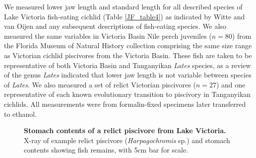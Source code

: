 We measured lower jaw length and standard length for all described species of Lake Victoria fish-eating cichlid (Table \ref{JF_table4}) as indicated by Witte and van Oijen \cite{witte1990taxonomy} and any subsequent descriptions of fish-eating species. \cite{van1991systematic, van1992haplochromis, van2004haplochromis, van2008haplochromis} We also measured the same variables in Victoria Basin Nile perch juveniles ($n=80$) from the Florida Museum of Natural History collection comprising the same size range as Victorian cichlid piscivores from the Victoria Basin. These fish are taken to be representative of both Victoria Basin and Tanganyikan {\em Lates} species, as a review \cite{greenwood1976review} of the genus {\em Lates} indicated that lower jaw length is not variable between species of {\em Lates}. We also measured a set of relict Victorian piscivores ($n=27$) and one representative of each known evolutionary transition to piscivory in Tanganyikan cichlids. All measurements were from formalin-fixed specimens later transferred to ethanol.

\begin{figure}
    \centering
    \caption{\textbf{Stomach contents of a relict piscivore from Lake Victoria.} X-ray of example relict piscivore ({\em Harpagochromis} sp.) and stomach contents showing fish remains, with 5cm bar for scale.}
    \label{FJ_fig8}
\end{figure}


